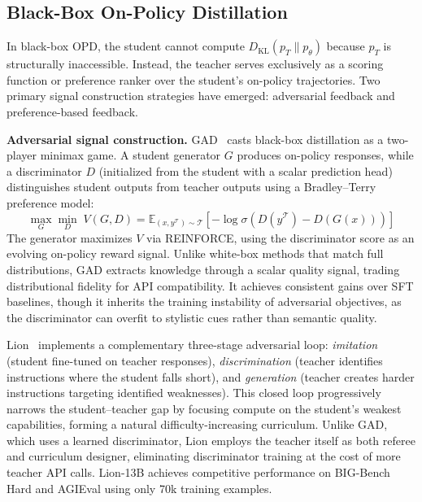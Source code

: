\documentclass{article} %
\newcommand{\KL}{D_{\mathrm{KL}}}
\newcommand{\ptheta}{p_\theta}
\newcommand{\pteacher}{p_T}
\begin{document}
\subsection{Black-Box On-Policy Distillation}
\label{subsec:black_box}

In black-box OPD, the student cannot compute $\KL(\pteacher \parallel \ptheta)$ because $\pteacher$ is structurally inaccessible. Instead, the teacher serves exclusively as a scoring function or preference ranker over the student's on-policy trajectories. Two primary signal construction strategies have emerged: adversarial feedback and preference-based feedback.

\textbf{Adversarial signal construction.}
GAD~\citep{2511.10643} casts black-box distillation as a two-player minimax game. A student generator $G$ produces on-policy responses, while a discriminator $D$ (initialized from the student with a scalar prediction head) distinguishes student outputs from teacher outputs using a Bradley--Terry preference model:
\begin{equation}
    \max_{G} \min_{D}\; V(G, D) = \mathbb{E}_{(x, y^{\mathcal{T}}) \sim \mathcal{T}} \left[ -\log \sigma\!\left( D(y^{\mathcal{T}}) - D(G(x)) \right) \right]
\end{equation}
The generator maximizes $V$ via REINFORCE, using the discriminator score as an evolving on-policy reward signal. Unlike white-box methods that match full distributions, GAD extracts knowledge through a scalar quality signal, trading distributional fidelity for API compatibility. It achieves consistent gains over SFT baselines, though it inherits the training instability of adversarial objectives, as the discriminator can overfit to stylistic cues rather than semantic quality.

Lion~\citep{2305.12870} implements a complementary three-stage adversarial loop: \emph{imitation} (student fine-tuned on teacher responses), \emph{discrimination} (teacher identifies instructions where the student falls short), and \emph{generation} (teacher creates harder instructions targeting identified weaknesses). This closed loop progressively narrows the student--teacher gap by focusing compute on the student's weakest capabilities, forming a natural difficulty-increasing curriculum. Unlike GAD, which uses a learned discriminator, Lion employs the teacher itself as both referee and curriculum designer, eliminating discriminator training at the cost of more teacher API calls. Lion-13B achieves competitive performance on BIG-Bench Hard and AGIEval using only 70k training examples.
\end{document}
